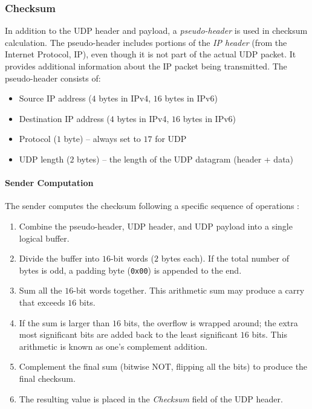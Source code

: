 \subsubsection{Checksum}
In addition to the UDP header and payload, a \emph{pseudo-header} is used in checksum calculation. 
The pseudo-header includes portions of the \emph{IP header} (from the Internet Protocol, IP), even though it is not part of the actual UDP packet. 
It provides additional information about the IP packet being transmitted. The pseudo-header consists of:
\begin{itemize}
    \item Source IP address (\( 4 \) bytes in IPv4, \( 16 \) bytes in IPv6)
    \item Destination IP address (\( 4 \) bytes in IPv4, \( 16 \) bytes in IPv6)
    \item Protocol (\( 1 \) byte) -- always set to \( 17 \) for UDP
    \item UDP length (\( 2 \) bytes) -- the length of the UDP datagram (header + data)
\end{itemize}

\paragraph{Sender Computation}
The sender computes the checksum following a specific sequence of operations \cite{rfc1071}:
\begin{enumerate}
    \item Combine the pseudo-header, UDP header, and UDP payload into a single logical buffer.
    \item Divide the buffer into \( 16 \)-bit words (\( 2 \) bytes each). If the total number of bytes is odd, a padding byte (\texttt{0x00}) is appended to the end.
    \item Sum all the \( 16 \)-bit words together. This arithmetic sum may produce a carry that exceeds \( 16 \) bits.
    \item If the sum is larger than \( 16 \) bits, the overflow is wrapped around; the extra most significant bits are added back to the least significant \( 16 \) bits. This arithmetic is known as one's complement addition.
    \item Complement the final sum (bitwise NOT, flipping all the bits) to produce the final checksum.
    \item The resulting value is placed in the \emph{Checksum} field of the UDP header.
\end{enumerate}

